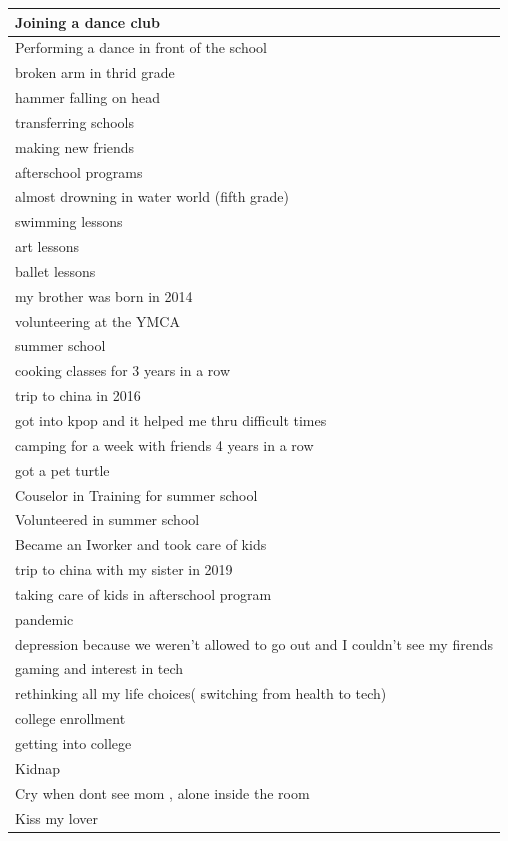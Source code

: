\documentclass[
  .7em,
  letterpaper,
  DIV=11,
  numbers=noendperiod]{scrartcl}
\begin{document}
\begin{table}
\begin{tabular}{l}
\hline
Joining a dance club\\
\hline
Performing a dance in front of the school\\
\hline
broken arm in thrid grade\\
\hline
hammer falling on head\\
\hline
transferring schools\\
\hline
making new friends\\
\hline
afterschool programs\\
\hline
almost drowning in water world (fifth grade)\\
\hline
swimming lessons\\
\hline
art lessons\\
\hline
ballet lessons\\
\hline
my brother was born in 2014\\
\hline
volunteering at the YMCA\\
\hline
summer school\\
\hline
cooking classes for 3 years in a row\\
\hline
trip to china in 2016\\
\hline
got into kpop and it helped me thru difficult times\\
\hline
camping for a week with friends 4 years in a row\\
\hline
got a pet turtle\\
\hline
Couselor in Training for summer school\\
\hline
Volunteered in summer school\\
\hline
Became an Iworker and took care of kids\\
\hline
trip to china with my sister in 2019\\
\hline
taking care of kids in afterschool program\\
\hline
pandemic\\
\hline
depression because we weren't allowed to go out and I couldn't see my firends\\
\hline
gaming and interest in tech\\
\hline
rethinking all my life choices( switching from health to tech)\\
\hline
college enrollment\\
\hline
getting into college\\
\hline
Kidnap\\
\hline
Cry when dont see mom , alone inside the room\\
\hline
Kiss my lover\\
\hline

\end{tabular}
\end{table}
\end{document}
